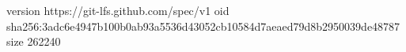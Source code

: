 version https://git-lfs.github.com/spec/v1
oid sha256:3adc6e4947b100b0ab93a5536d43052cb10584d7aeaed79d8b2950039de48787
size 262240

